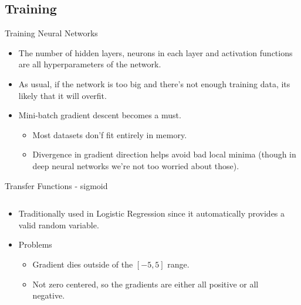 \subsection{Training}
\begin{frame}{Training Neural Networks}
	\begin{itemize}
		\item The number of hidden layers, neurons in each layer and activation functions are all hyperparameters of the network.
		\item As usual, if the network is too big and there's not enough training data, its likely that it will overfit.
		\item Mini-batch gradient descent becomes a must.
		      \begin{itemize}
		      	\item Most datasets don'f fit entirely in memory.
		      	\item Divergence in gradient direction helps avoid bad local minima (though in deep neural networks we're not too worried about those).
		      \end{itemize}
	\end{itemize}
\end{frame}

\begin{frame}{Transfer Functions - sigmoid}
	\begin{columns}
		\begin{column}{0.5\textwidth}
			\begin{itemize}
				\item Traditionally used in Logistic Regression since it automatically provides a valid random variable.
				\item Problems
				      \begin{itemize}
				      	\item Gradient dies outside of the $[-5, 5]$ range.
				      	\item Not zero centered, so the gradients are either all positive or all negative.
				      \end{itemize}
			\end{itemize}
		\end{column}
		\begin{column}{0.5\textwidth}
		\end{column}
	\end{columns}
\end{frame}

